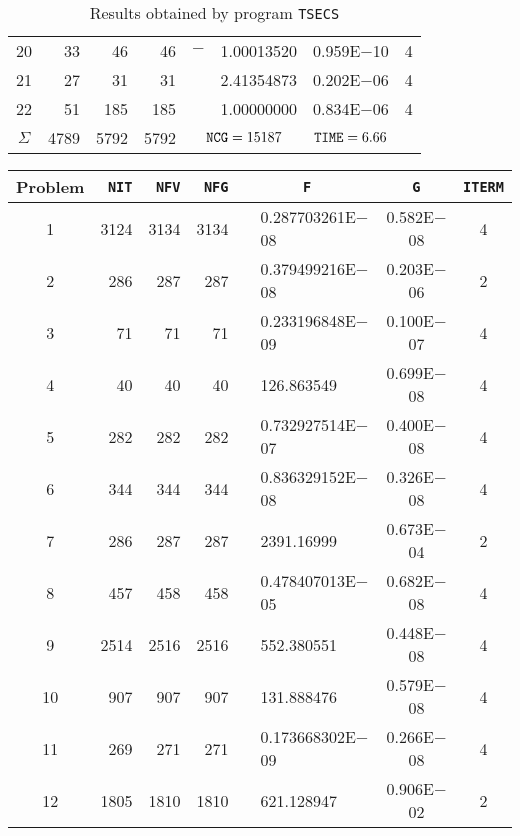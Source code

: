 \documentclass{esub2acm}
\begin{document}
\begin{table}
\begin{tabular}{c|rrrr@{}lcc}
20  &   33  &   46  &   46  &   $-$ &   1.00013520  &   0.959E$-$10 &   4   \\
21  &   27  &   31  &   31  &       &   2.41354873  &   0.202E$-$06 &   4   \\
22  &   51  &   185 &   185 &       &   1.00000000  &   0.834E$-$06 &   4   \\ \hline
$\Sigma$\rule[-2pt]{0pt}{12pt}  &   4789    &   5792    &   5792    &   \multicolumn{2}{c}{${\tt NCG} = 15187$}  &   ${\tt TIME} = 6.66$   & \\ \hline
\end{tabular}
\caption{Results obtained by program {\tt TSECS}}
\label{tsecs}
\end{table}

\clearpage

\begin{table}
\footnotesize
\centering
\begin{tabular}{c|rrrr@{}lcc} \hline
Problem\rule[-2pt]{0pt}{12pt} & {\tt NIT} & {\tt NFV} & {\tt NFG} & \multicolumn{2}{c}{\tt F} & {\tt G} & {\tt ITERM} \\ \hline
1\rule[-2pt]{0pt}{12pt} &   3124    &   3134    &   3134    &       &   0.287703261E$-$08   &   0.582E$-$08 &   4   \\
2   &   286 &   287 &   287 &       &   0.379499216E$-$08   &   0.203E$-$06 &   2   \\
3   &   71  &   71  &   71  &       &   0.233196848E$-$09   &   0.100E$-$07 &   4   \\
4   &   40  &   40  &   40  &       &   126.863549  &   0.699E$-$08 &   4   \\
5   &   282 &   282 &   282 &       &   0.732927514E$-$07   &   0.400E$-$08 &   4   \\
6   &   344 &   344 &   344 &       &   0.836329152E$-$08   &   0.326E$-$08 &   4   \\
7   &   286 &   287 &   287 &       &   2391.16999  &   0.673E$-$04 &   2   \\
8   &   457 &   458 &   458 &       &   0.478407013E$-$05   &   0.682E$-$08 &   4   \\
9   &   2514    &   2516    &   2516    &       &   552.380551  &   0.448E$-$08 &   4   \\
10  &   907 &   907 &   907 &       &   131.888476  &   0.579E$-$08 &   4   \\
11  &   269 &   271 &   271 &       &   0.173668302E$-$09   &   0.266E$-$08 &   4   \\
12  &   1805    &   1810    &   1810    &       &   621.128947  &   0.906E$-$02 &   2   \\

\end{tabular}
\end{table}
\end{document}
